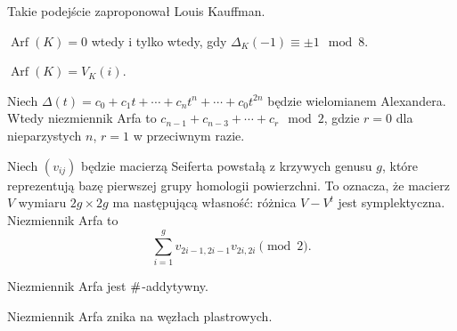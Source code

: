 Takie podejście zaproponował Louis Kauffman.

\begin{proposition}[Murasugi]
	$\operatorname{Arf}(K) = 0$ wtedy i tylko wtedy, gdy $\Delta_K(-1) \equiv \pm 1 \mod 8$.
\end{proposition}

\begin{proposition}[Jones, 1985]
	$\operatorname{Arf}(K) = V_K(i)$.
\end{proposition}

\begin{proposition}[Robertello]
	Niech $ \Delta (t)=c_{0}+c_{1}t+\cdots +c_{n}t^{n}+\cdots +c_{0}t^{2n}$ będzie wielomianem Alexandera.
	Wtedy niezmiennik Arfa to $ c_{n-1}+c_{n-3}+\cdots +c_{r}\mod 2$, gdzie $r = 0$ dla nieparzystych $n$, $r = 1$ w przeciwnym razie.
\end{proposition}

\begin{proposition}
	Niech $(v_{ij})$ będzie macierzą Seiferta powstałą z krzywych genusu $g$, które reprezentują bazę pierwszej grupy homologii powierzchni.
	To oznacza, że macierz $V$ wymiaru $2g \times 2g$ ma następującą własność: różnica $V - V^t$ jest symplektyczna.
	Niezmiennik Arfa to
	\[
		\sum^g_{i=1}v_{2i-1,2i-1}v_{2i,2i} \pmod 2.
	\]
\end{proposition}

\begin{proposition}
	Niezmiennik Arfa jest $\mathbin{\#}$-addytywny.
\end{proposition}

\begin{proposition}
	Niezmiennik Arfa znika na węzłach plastrowych.
\end{proposition}

